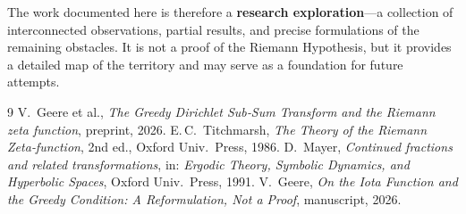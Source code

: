 \documentclass[11pt,a4paper]{article}
\begin{document}
The work documented here is therefore a \textbf{research exploration}—a collection of interconnected observations, partial results, and precise formulations of the remaining obstacles.  It is not a proof of the Riemann Hypothesis, but it provides a detailed map of the territory and may serve as a foundation for future attempts.

\begin{thebibliography}{9}
 V.\ Geere et al., \textit{The Greedy Dirichlet Sub‑Sum Transform and the Riemann zeta function}, preprint, 2026.
 E.\,C.\ Titchmarsh, \textit{The Theory of the Riemann Zeta‑function}, 2nd ed., Oxford Univ.\ Press, 1986.
 D.\ Mayer, \textit{Continued fractions and related transformations}, in: \textit{Ergodic Theory, Symbolic Dynamics, and Hyperbolic Spaces}, Oxford Univ.\ Press, 1991.
 V.\ Geere, \textit{On the Iota Function and the Greedy Condition: A Reformulation, Not a Proof}, manuscript, 2026.
\end{thebibliography}
\end{document}
